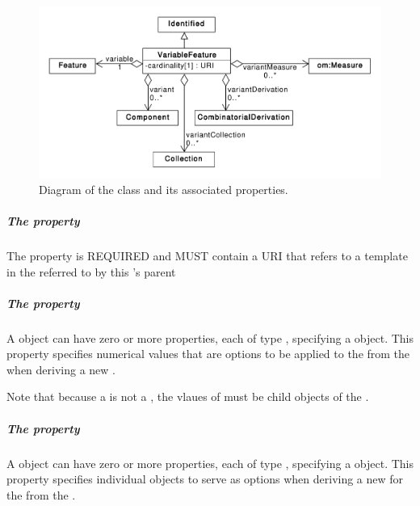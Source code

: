 \begin{figure}[ht]
\begin{center}
\includegraphics[scale=0.6]{uml/variable_component}
\caption[]{Diagram of the  class and its associated properties.}
\label{uml:variable_component}
\end{center}
\end{figure}

\subparagraph{The  property}\label{sec:variable}

The  property is REQUIRED and MUST contain a URI that refers to a template  in the   referred to by this 's parent 

\subparagraph{The  property}\label{sec:variantMeasure}

A  object can have zero or more  properties, each of type , specifying a  object. This property specifies numerical values that are options to be applied to the   from the  when deriving a new .

Note that because a  is not a , the vlaues of  must be child objects of the .

\subparagraph{The  property}\label{sec:variant}

A  object can have zero or more  properties, each of type , specifying a  object. This property specifies individual  objects to serve as options when deriving a new
 for the   from the .

